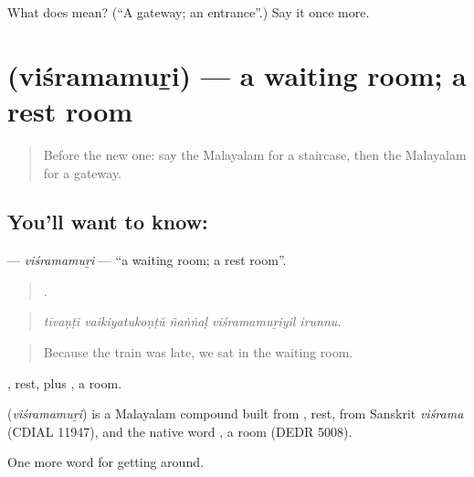 \begin{tcolorbox}[breakable,colback=teal!4,colframe=teal!35!black,title={Before you move on}]
What does  mean? (\textquotedblleft{}A gateway; an entrance\textquotedblright{}.) Say it once more.
\end{tcolorbox}
\section[\texorpdfstring{\ml{വിശ്രമമുറി} (viśramamuṟi)}{വിശ്രമമുറി (viśramamuṟi)}]{ (viśramamuṟi) — a waiting room; a rest room}

\label{lesson:ML-C485-visramamuri}



\begin{quote}
Before the new one: say the Malayalam for a staircase, then the Malayalam for a gateway.
\end{quote}

\subsection*{You'll want to know: }
\textbf{} — \emph{viśramamuṟi} — \textquotedblleft{}a waiting room; a rest room\textquotedblright{}.

\begin{quote}
    .
\end{quote}

\begin{quote}
\emph{tīvaṇṭi vaikiyatukoṇṭŭ ñaṅṅaḷ viśramamuṟiyil irunnu.}
\end{quote}

\begin{quote}
Because the train was late, we sat in the waiting room.
\end{quote}

, rest, plus , a room.

\begin{cousinweb}
\textbf{} (\emph{viśramamuṟi}) is a Malayalam compound built from , rest, from Sanskrit \emph{viśrama} (CDIAL 11947), and the native word , a room (DEDR 5008).
\end{cousinweb}

\begin{grammarlens}[title={What you've built}]
One more word for getting around.
\end{grammarlens}

